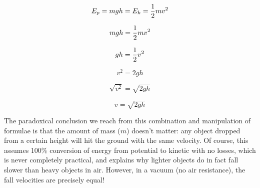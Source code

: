 $$E_p = m g h = E_k = {1 \over 2} m v^2$$

$$m g h = {1 \over 2} m v^2$$

$$g h = {1 \over 2} v^2$$

$$v^2 = 2 g h$$

$$\sqrt{v^2} = \sqrt{2 g h}$$

$$v = \sqrt{2 g h}$$

The paradoxical conclusion we reach from this combination and manipulation of formulae is that the amount of mass ($m$) doesn't matter: any object dropped from a certain height will hit the ground with the same velocity.  Of course, this assumes 100\% conversion of energy from potential to kinetic with no losses, which is never completely practical, and explains why lighter objects do in fact fall slower than heavy objects in air.  However, in a vacuum (no air resistance), the fall velocities are precisely equal!











